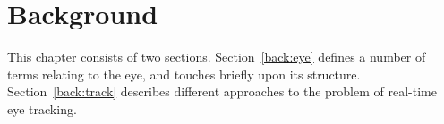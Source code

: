 
\chapter{Background}
\label{back}

This chapter consists of two sections.  Section~\ref{back:eye} defines
a number of terms relating to the eye, and touches briefly upon its
structure.  Section~\ref{back:track} describes different approaches to
the problem of real-time eye tracking.



